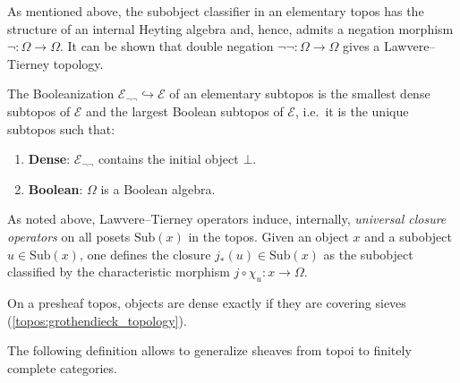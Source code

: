     \begin{example}\label{topos:double_negation}
        As mentioned above, the subobject classifier in an elementary topos has the structure of an internal Heyting algebra and, hence, admits a negation morphism $\lnot:\Omega\rightarrow\Omega$. It can be shown that double negation $\lnot\lnot:\Omega\rightarrow\Omega$ gives a Lawvere--Tierney topology.
    \end{example}
    \begin{property}
        The Booleanization $\mathcal{E}_{\lnot\lnot}\hookrightarrow\mathcal{E}$ of an elementary subtopos is the smallest dense subtopos of $\mathcal{E}$ and the largest Boolean subtopos of $\mathcal{E}$, i.e.~it is the unique subtopos such that:
        \begin{enumerate}
            \item\textbf{Dense}: $\mathcal{E}_{\lnot\lnot}$ contains the initial object $\bot$.
            \item\textbf{Boolean}: $\Omega$ is a Boolean algebra.
        \end{enumerate}
    \end{property}
    
    As noted above, Lawvere--Tierney operators induce, internally, \textit{universal closure operators} on all posets $\mathrm{Sub}(x)$ in the topos. Given an object $x$ and a subobject $u\in\text{Sub}(x)$, one defines the closure $j_\ast(u)\in\text{Sub}(x)$ as the subobject classified by the characteristic morphism $j\circ\chi_u:x\rightarrow\Omega$.

    \begin{example}
        On a presheaf topos, objects are dense exactly if they are covering sieves (\cref{topos:grothendieck_topology}).
    \end{example}

    The following definition allows to generalize sheaves from topoi to finitely complete categories.

